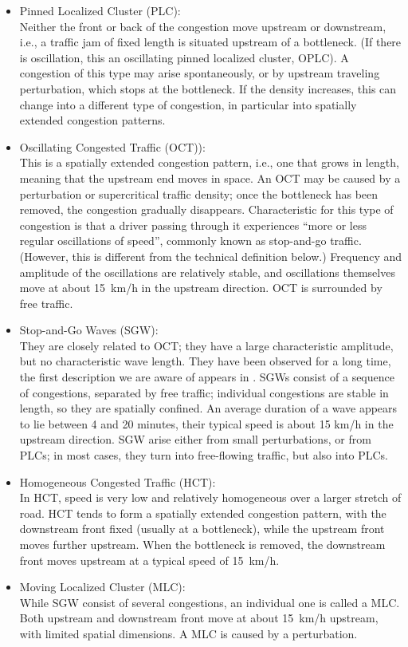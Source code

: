 \documentclass{acmrip}
\begin{document}
    \begin{itemize}
    \item Pinned Localized Cluster (PLC):\\
Neither the front or back of the congestion move upstream or
downstream, i.e., a traffic jam of fixed length is situated upstream
of a bottleneck. (If there is oscillation, this an oscillating
pinned localized
    cluster, OPLC).
A congestion of this type may arise spontaneously, or by upstream
traveling perturbation, which stops at the bottleneck. If the
density increases, this can change into a different type of
congestion, in particular into spatially extended congestion
patterns.

    \item Oscillating Congested Traffic (OCT)):\\
    This is a spatially extended congestion pattern, i.e., one that
grows in length, meaning that the upstream end moves in space. An
OCT may be caused by a perturbation or supercritical traffic
density; once the bottleneck has been removed, the congestion
gradually disappears. Characteristic for this type of congestion is
that a driver passing through it experiences ``more or less regular
oscillations of speed'', commonly known as stop-and-go traffic.
(However, this is different from the technical definition below.)
Frequency and amplitude of the oscillations are relatively stable,
and oscillations themselves move at about 15~km/h in the upstream
direction. OCT is surrounded by free traffic.

    \item Stop-and-Go Waves (SGW):\\
They are closely related to OCT; they have a large characteristic
amplitude, but no characteristic wave length. They have been
observed for a long time, the first description we are aware of
appears in \cite{ef-tft-58}. SGWs consist of a sequence of
congestions, separated by free traffic; individual congestions are
stable in length, so they are spatially confined.
    An average duration of a wave appears to lie between 4 and 20 minutes,
their typical speed is about 15 km/h in the upstream direction. SGW
arise either from small perturbations, or from PLCs; in most cases,
they turn into free-flowing traffic, but also into PLCs.

    \item Homogeneous Congested Traffic (HCT):\\
In HCT, speed is very low and relatively homogeneous over a larger
stretch of road. HCT tends to form a spatially extended congestion
pattern, with the downstream front fixed (usually at a bottleneck),
while the upstream front moves further upstream. When the bottleneck
is removed, the downstream front moves upstream at a typical speed
of 15~km/h.

    \item Moving Localized Cluster (MLC):\\
While SGW consist of several congestions, an individual one is
called a MLC. Both upstream and downstream front move at about
15~km/h upstream, with limited spatial dimensions. A MLC is caused
by a perturbation.
    \end{itemize}
\end{document}
